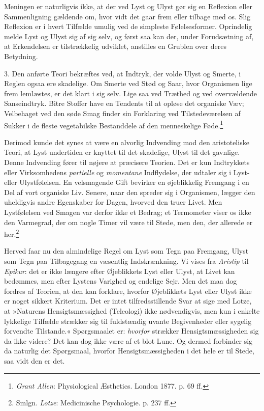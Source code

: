 \documentclass[12pt,a4paper,openany]{book}
\newcommand{\opage}[1]{\marginnote{\footnotesize\textit{[#1]}}}
\begin{document}
Meningen er naturligvis ikke, at der ved Lyst og Ulyst gør sig en
Reflexion eller Sammenligning gældende om, hvor vidt det gaar frem eller
tilbage med os. Slig Reflexion er i hvert Tilfælde umulig ved de
simpleste Følelsesformer. Oprindelig melde Lyst og Ulyst sig af sig
selv, og først saa kan der, under Forudsætning af, at Erkendelsen er
tilstrækkelig udviklet, anstilles en Grublen over deres Betydning.

3. Den anførte Teori bekræftes ved, at Indtryk, der volde Ulyst og
Smerte, i Reglen ogsaa ere skadelige. Om Smerte ved Stød og Saar, hvor
Organismen lige frem lemlæstes, er det klart i sig selv. Lige saa ved
Træthed og ved overvældende Sanseindtryk. Bitre Stoffer have en Tendents
til at opløse det organiske Væv; Velbehaget ved den søde Smag finder sin
Forklaring ved Tilstedeværelsen af Sukker i de fleste vegetabilske
Bestanddele af den menneskelige Føde.\footnote[2]{\emph{Grant Allen}: Physiological Æsthetics. London 1877. p. 69 ff.}


\opage{324}Derimod kunde det synes at være en alvorlig Indvending mod
den aristoteliske Teori, at Lyst undertiden er knyttet til det
skadelige, Ulyst til det gavnlige. Denne Indvending fører til nøjere at
præcisere Teorien. Det er kun Indtrykkets eller Virksomhedens
\emph{partielle} og \emph{momentane} Indflydelse, der udtaler sig i
Lyst- eller Ulystfølelsen. En velsmagende Gift bevirker en øjeblikkelig
Fremgang i en Del af vort organiske Liv. Senere, naar den spreder sig i
Organismen, lægger den uheldigvis andre Egenskaber for Dagen, hvorved
den truer Livet. Men Lystfølelsen ved Smagen var derfor ikke et Bedrag;
et Termometer viser os ikke den Varmegrad, der om nogle Timer vil være
til Stede, men den, der allerede er her.\footnote[1]{Smlgn. \emph{Lotze}: Medicinische Psychologie. p. 237 ff.}

Herved faar nu den almindelige Regel om Lyst som Tegn paa Fremgang,
Ulyst som Tegn paa Tilbagegang en væsentlig Indskrænkning. Vi vises fra
\emph{Aristip} til \emph{Epikur}: det er ikke længere efter Øjeblikkets
Lyst eller Ulyst, at Livet kan bedømmes, men efter Lystens Varighed og
endelige Sejr. Men det maa dog fordres af Teorien, at den kan forklare,
hvorfor Øjeblikkets Lyst eller Ulyst ikke er noget sikkert Kriterium.
Det er intet tilfredsstillende Svar at sige med Lotze, at »Naturens
Hensigtsmæssighed (Teleologi) ikke nødvendigvis, men kun i enkelte
lykkelige Tilfælde strækker sig til fuldstændig uvante Begivenheder
eller sygelig forvendte Tilstande.« Spørgsmaalet er: \emph{hvorfor}
strækker Hensigtsmæssigheden sig da ikke videre? Det kan dog ikke være
af et blot Lune. Og dermed forbinder sig da naturlig det Spørgsmaal,
hvorfor Hensigtsmæssigheden i det hele er til Stede, saa vidt den er
det.
\end{document}
